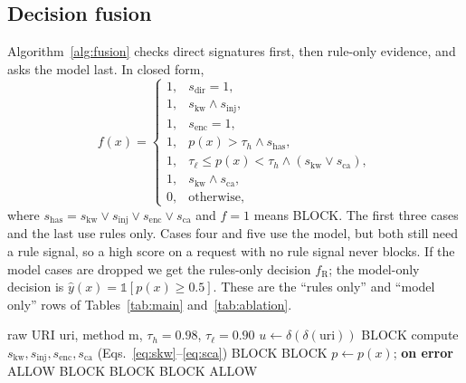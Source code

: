 \documentclass[preprint,11pt]{elsarticle}
\begin{document}
\subsection{Decision fusion}
Algorithm~\ref{alg:fusion} checks direct signatures first, then rule-only
evidence, and asks the model last. In closed form,
\begin{equation}
f(x)=
\begin{cases}
1, & s_{\text{dir}}=1,\\
1, & s_{\text{kw}}\wedge s_{\text{inj}},\\
1, & s_{\text{enc}}=1,\\
1, & p(x)>\tau_h \wedge s_{\text{has}},\\
1, & \tau_\ell\le p(x)<\tau_h \wedge (s_{\text{kw}}\vee s_{\text{ca}}),\\
1, & s_{\text{kw}}\wedge s_{\text{ca}},\\
0, & \text{otherwise},
\end{cases}
\label{eq:fusion}
\end{equation}
where $s_{\text{has}}=s_{\text{kw}}\vee s_{\text{inj}}\vee s_{\text{enc}}\vee
s_{\text{ca}}$ and $f=1$ means BLOCK. The first three cases and the last
use rules only. Cases four and five use the model, but both still need a
rule signal, so a high score on a request with no rule signal never blocks.
If the model cases are dropped we get the rules-only decision
$f_{\text{R}}$; the model-only decision is
$\hat y(x)=\mathbb{1}[p(x)\ge0.5]$. These are the ``rules only'' and
``model only'' rows of Tables~\ref{tab:main} and~\ref{tab:ablation}.

\begin{algorithm}[t]
\caption{Decision fusion}
\label{alg:fusion}
\begin{algorithmic}[1]
\Require raw URI $\mathrm{uri}$, method $\mathrm{m}$, $\tau_h{=}0.98$, $\tau_\ell{=}0.90$
\State $u \gets \delta(\delta(\mathrm{uri}))$
 \Return BLOCK \EndIf
\State compute $s_{\text{kw}},s_{\text{inj}},s_{\text{enc}},s_{\text{ca}}$ (Eqs.~\eqref{eq:skw}--\eqref{eq:sca})
 \Return BLOCK \EndIf
{} \Return BLOCK \EndIf
\State $p\gets p(x)$; \textbf{on error} \Return ALLOW
 \Return BLOCK \EndIf
{} \Return BLOCK \EndIf
{} \Return BLOCK \EndIf
\State \Return ALLOW
\end{algorithmic}
\end{algorithm}
\end{document}
